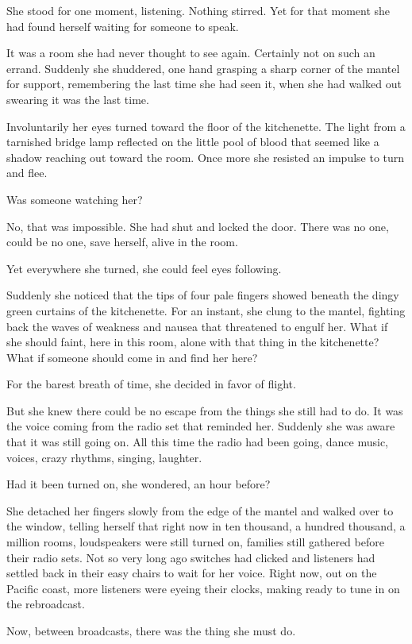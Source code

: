 \documentclass{novel}
\begin{document}
She stood for one moment, listening. Nothing stirred. Yet for that moment she had found herself waiting for someone to speak.

It was a room she had never thought to see again. Certainly not on such an errand. Suddenly she shuddered, one hand grasping a sharp corner of the mantel for support, remembering the last time she had seen it, when she had walked out swearing it was the last time.

Involuntarily her eyes turned toward the floor of the kitchenette. The light from a tarnished bridge lamp reflected on the little pool of blood that seemed like a shadow reaching out toward the room. Once more she resisted an impulse to turn and flee.

Was someone watching her?

No, that was impossible. She had shut and locked the door. There was no one, could be no one, save herself, alive in the room.

Yet everywhere she turned, she could feel eyes following.

Suddenly she noticed that the tips of four pale fingers showed beneath the dingy green curtains of the kitchenette. For an instant, she clung to the mantel, fighting back the waves of weakness and nausea that threatened to engulf her. What if she should faint, here in this room, alone with that thing in the kitchenette? What if someone should come in and find her here?

For the barest breath of time, she decided in favor of flight.

But she knew there could be no escape from the things she still had to do. It was the voice coming from the radio set that reminded her. Suddenly she was aware that it was still going on. All this time the radio had been going, dance music, voices, crazy rhythms, singing, laughter.

Had it been turned on, she wondered, an hour before?

She detached her fingers slowly from the edge of the mantel and walked over to the window, telling herself that right now in ten thousand, a hundred thousand, a million rooms, loudspeakers were still turned on, families still gathered before their radio sets. Not so very long ago switches had clicked and listeners had settled back in their easy chairs to wait for her voice. Right now, out on the Pacific coast, more listeners were eyeing their clocks, making ready to tune in on the rebroadcast.

Now, between broadcasts, there was the thing she must do.
\end{document}
